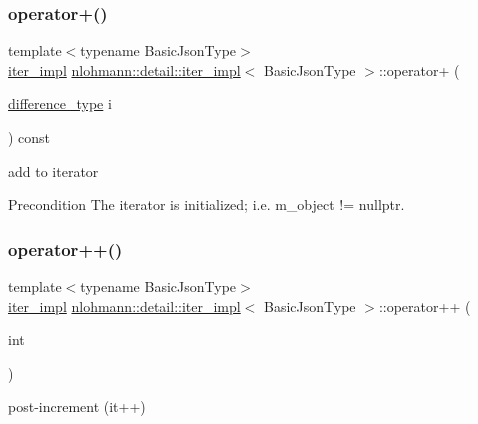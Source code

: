 \subsubsection{\texorpdfstring{operator+()}{operator+()}}
{\footnotesize\ttfamily template$<$typename Basic\+Json\+Type$>$ \\
\hyperlink{classnlohmann_1_1detail_1_1iter__impl}{iter\+\_\+impl} \hyperlink{classnlohmann_1_1detail_1_1iter__impl}{nlohmann\+::detail\+::iter\+\_\+impl}$<$ Basic\+Json\+Type $>$\+::operator+ (\begin{DoxyParamCaption}\item[{\hyperlink{classnlohmann_1_1detail_1_1iter__impl_a2f7ea9f7022850809c60fc3263775840}{difference\+\_\+type}}]{i }\end{DoxyParamCaption}) const\hspace{0.3cm}{\ttfamily [inline]}}



add to iterator 

\begin{DoxyPrecond}{Precondition}
The iterator is initialized; i.\+e. {\ttfamily m\+\_\+object != nullptr}. 
\end{DoxyPrecond}
\mbox{\label{classnlohmann_1_1detail_1_1iter__impl_ae64452217b17567717039a158f8bc029}} 
\subsubsection{\texorpdfstring{operator++()}{operator++()}\hspace{0.1cm}{\footnotesize\ttfamily [1/2]}}
{\footnotesize\ttfamily template$<$typename Basic\+Json\+Type$>$ \\
\hyperlink{classnlohmann_1_1detail_1_1iter__impl}{iter\+\_\+impl} \hyperlink{classnlohmann_1_1detail_1_1iter__impl}{nlohmann\+::detail\+::iter\+\_\+impl}$<$ Basic\+Json\+Type $>$\+::operator++ (\begin{DoxyParamCaption}\item[{int}]{ }\end{DoxyParamCaption})\hspace{0.3cm}{\ttfamily [inline]}}



post-\/increment (it++) 


